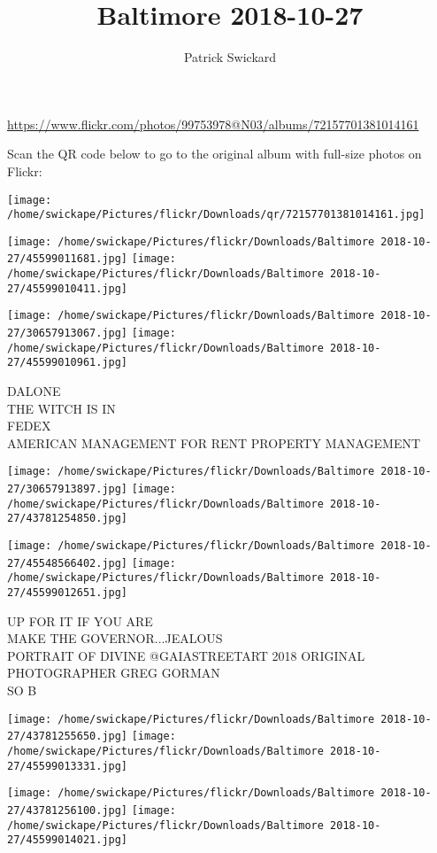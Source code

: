 \documentclass[10pt,letterpaper]{article}
\title{Baltimore 2018-10-27}
\author{Patrick Swickard}
\date{}
\begin{document}
\maketitle

\url{https://www.flickr.com/photos/99753978@N03/albums/72157701381014161}

Scan the QR code below to go to the original album with full-size photos on Flickr:

\texttt{[image: /home/swickape/Pictures/flickr/Downloads/qr/72157701381014161.jpg]}
\pagebreak

\texttt{[image: /home/swickape/Pictures/flickr/Downloads/Baltimore 2018-10-27/45599011681.jpg]}
\texttt{[image: /home/swickape/Pictures/flickr/Downloads/Baltimore 2018-10-27/45599010411.jpg]}

\texttt{[image: /home/swickape/Pictures/flickr/Downloads/Baltimore 2018-10-27/30657913067.jpg]}
\texttt{[image: /home/swickape/Pictures/flickr/Downloads/Baltimore 2018-10-27/45599010961.jpg]}

DALONE\\
THE WITCH IS IN\\
FEDEX\\
AMERICAN MANAGEMENT FOR RENT PROPERTY MANAGEMENT
\pagebreak

\texttt{[image: /home/swickape/Pictures/flickr/Downloads/Baltimore 2018-10-27/30657913897.jpg]}
\texttt{[image: /home/swickape/Pictures/flickr/Downloads/Baltimore 2018-10-27/43781254850.jpg]}

\texttt{[image: /home/swickape/Pictures/flickr/Downloads/Baltimore 2018-10-27/45548566402.jpg]}
\texttt{[image: /home/swickape/Pictures/flickr/Downloads/Baltimore 2018-10-27/45599012651.jpg]}

UP FOR IT IF YOU ARE\\
MAKE THE GOVERNOR...JEALOUS\\
PORTRAIT OF DIVINE @GAIASTREETART 2018 ORIGINAL PHOTOGRAPHER GREG GORMAN\\
SO B
\pagebreak

\texttt{[image: /home/swickape/Pictures/flickr/Downloads/Baltimore 2018-10-27/43781255650.jpg]}
\texttt{[image: /home/swickape/Pictures/flickr/Downloads/Baltimore 2018-10-27/45599013331.jpg]}

\texttt{[image: /home/swickape/Pictures/flickr/Downloads/Baltimore 2018-10-27/43781256100.jpg]}
\texttt{[image: /home/swickape/Pictures/flickr/Downloads/Baltimore 2018-10-27/45599014021.jpg]}
\end{document}
